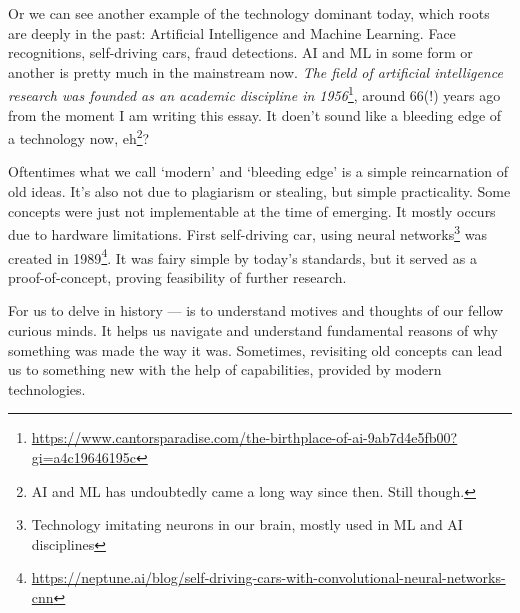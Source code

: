 \documentclass[../../what-is-computer]{subfiles}
\begin{document}
    Or we can see another example of the technology dominant today, which roots are deeply in the past: Artificial Intelligence and Machine Learning. Face recognitions, self-driving cars, fraud detections.
    AI and ML in some form or another is pretty much in the mainstream now. \emph{The field of artificial intelligence research was founded as an academic discipline in 1956}\footnote{
    \href{https://www.cantorsparadise.com/the-birthplace-of-ai-9ab7d4e5fb00?gi=a4c19646195c}{https://www.cantorsparadise.com/the-birthplace-of-ai-9ab7d4e5fb00?gi=a4c19646195c}}, around 66(!) years ago 
    from the moment I am writing this essay. It doen't sound like a bleeding edge of a technology now, eh\footnote{AI and ML has undoubtedly came a long way since then. Still though.}? \par

    Oftentimes what we call `modern' and `bleeding edge' is a simple reincarnation of old ideas. It's also not due to plagiarism or stealing, but simple practicality.
    Some concepts were just not implementable at the time of emerging. It mostly occurs due to hardware limitations. First self-driving car, using neural 
    networks\footnote{Technology imitating neurons in our brain, mostly used in ML and AI disciplines} was created in 1989\footnote{\href{https://neptune.ai/blog/self-driving-cars-with-convolutional-neural-networks-cnn}
    {https://neptune.ai/blog/self-driving-cars-with-convolutional-neural-networks-cnn}}. It was fairy simple by today's standards, but it served as a proof-of-concept,
    proving feasibility of further research. \par

    For us to delve in history --- is to understand motives and thoughts of our fellow curious minds. It helps us navigate and understand fundamental reasons of why
    something was made the way it was. Sometimes, revisiting old concepts can lead us to something new with the help of capabilities, provided by modern technologies.
\end{document}
